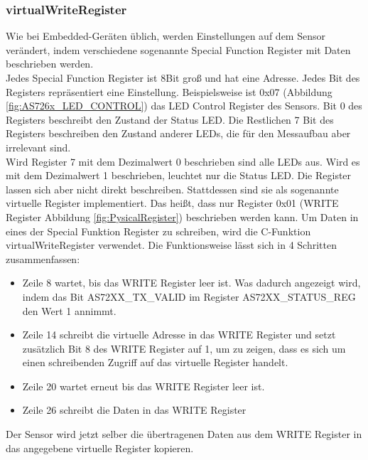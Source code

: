 \subsubsection{virtualWriteRegister}
Wie bei Embedded-Geräten üblich, werden Einstellungen auf dem Sensor verändert, indem verschiedene sogenannte Special Function Register mit Daten beschrieben werden.\\
Jedes Special Function Register ist 8Bit groß und hat eine Adresse. Jedes Bit des Registers repräsentiert eine Einstellung.
Beispielsweise ist 0x07 (Abbildung \ref{fig:AS726x_LED_CONTROL}) das LED Control Register des Sensors.
Bit 0 des Registers beschreibt den Zustand der Status LED.
Die Restlichen 7 Bit des Registers beschreiben den Zustand anderer LEDs, die für den Messaufbau aber irrelevant sind.\\
Wird Register 7 mit dem Dezimalwert 0 beschrieben sind alle LEDs aus. Wird es mit dem Dezimalwert 1 beschrieben, leuchtet nur die Status LED.
Die Register lassen sich aber nicht direkt beschreiben. Stattdessen sind sie als sogenannte virtuelle Register implementiert.
Das heißt, dass nur Register 0x01 (WRITE Register Abbildung \ref{fig:PysicalRegister}) beschrieben werden kann.
Um Daten in eines der Special Funktion Register zu schreiben, wird die C-Funktion virtualWriteRegister verwendet.
Die Funktionsweise lässt sich in 4 Schritten zusammenfassen:
\begin{itemize}
	\item Zeile 8 wartet, bis das WRITE Register leer ist. Was dadurch angezeigt wird, indem  das Bit AS72XX\_TX\_VALID im  Register AS72XX\_STATUS\_REG den Wert 1 annimmt.
	\item Zeile 14 schreibt die virtuelle Adresse in das WRITE Register und setzt zusätzlich Bit 8 des WRITE Register auf 1, um zu zeigen, dass es sich um einen schreibenden Zugriff auf das virtuelle Register handelt.
	\item Zeile 20 wartet erneut bis das WRITE Register leer ist.
	\item Zeile 26 schreibt die Daten in das WRITE Register
\end{itemize}
Der Sensor wird jetzt selber die übertragenen Daten aus dem WRITE Register in das angegebene virtuelle Register kopieren.


